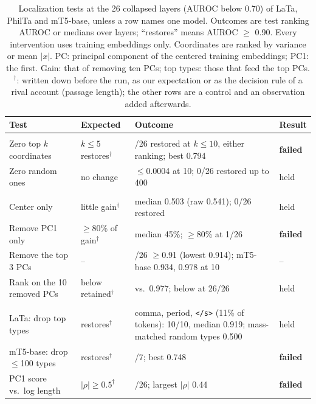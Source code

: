 \begin{table}[t]
\centering
\footnotesize
\setlength{\tabcolsep}{2.5pt}
\begin{tabular}{@{}>{\raggedright\arraybackslash}p{}>{\raggedright\arraybackslash}p{}>{\raggedright\arraybackslash}p{}l@{}}
\toprule
Test & Expected & Outcome & Result \\
\midrule
\multicolumn{4}{@{}l}{\emph{Coordinates}} \\
Zero top $k$ coordinates & $k{\le}5$ restores$^\dagger$ & 0/26 restored at $k{\le}10$, either ranking; best 0.794 & \textbf{failed} \\
Zero random ones & no change & $\le$0.0004 at 10; 0/26 restored up to 400 & held \\
\addlinespace
\multicolumn{4}{@{}l}{\emph{Principal directions}} \\
Center only & little gain$^\dagger$ & median 0.503 (raw 0.541); 0/26 restored & held \\
Remove PC1 only & $\ge$80\% of gain$^\dagger$ & median 45\%; $\ge$80\% at 1/26 & \textbf{failed} \\
Remove the top 3 PCs & -- & 26/26 $\ge$0.91 (lowest 0.914); mT5-base 0.934, 0.978 at 10 & -- \\
Rank on the 10 removed PCs & below retained$^\dagger$ & 0.489 vs.\ 0.977; below at 26/26 & held \\
\addlinespace
\multicolumn{4}{@{}l}{\emph{Tokens}} \\
LaTa: drop top types & restores$^\dagger$ & comma, period, \texttt{</s>} (11\% of tokens): 10/10, median 0.919; mass-matched random types 0.500 & held \\
mT5-base: drop $\le$100 types & restores$^\dagger$ & 0/7; best 0.748 & \textbf{failed} \\
PC1 score vs.\ log length & $|\rho|{\ge}0.5^\dagger$ & 0/26; largest $|\rho|$ 0.44 & \textbf{failed} \\
\bottomrule
\end{tabular}
\caption{Localization tests at the 26 collapsed layers (AUROC below 0.70) of LaTa, PhilTa and mT5-base, unless a row names one model. Outcomes are test ranking AUROC or medians over layers; ``restores'' means AUROC $\ge$ 0.90. Every intervention uses training embeddings only. Coordinates are ranked by variance or mean $|x|$. PC: principal component of the centered training embeddings; PC1: the first. Gain: that of removing ten PCs; top types: those that feed the top PCs. $^\dagger$: written down before the run, as our expectation or as the decision rule of a rival account (passage length); the other rows are a control and an observation added afterwards.}
\label{tab:predictions}
\end{table}
